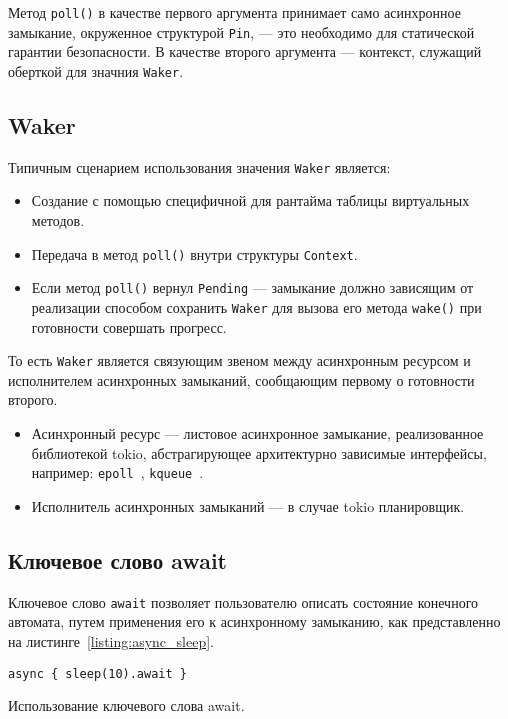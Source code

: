 Метод \verb|poll()| в качестве первого аргумента принимает само асинхронное замыкание, окруженное структурой \verb|Pin|, --- это необходимо для статической гарантии безопасности. В качестве второго аргумента --- контекст, служащий оберткой для значния \verb|Waker|.

\subsection{Waker}

Типичным сценарием использования значения \verb|Waker| является:

\begin{itemize}
    \item Создание с помощью специфичной для рантайма таблицы виртуальных методов.
    \item Передача в метод \verb|poll()| внутри структуры \verb|Context|.
    \item Если метод \verb|poll()| вернул \verb|Pending| --- замыкание должно зависящим от реализации способом сохранить \verb|Waker| для вызова его метода \verb|wake()| при готовности совершать прогресс.
\end{itemize}

То есть \verb|Waker| является связующим звеном между асинхронным ресурсом и исполнителем асинхронных замыканий, сообщающим первому о готовности второго.

\begin{itemize}
    \item Асинхронный ресурс --- листовое асинхронное замыкание, реализованное библиотекой tokio, абстрагирующее архитектурно зависимые интерфейсы, например: \verb|epoll|~\cite{epollLib}, \verb|kqueue|~\cite{kqueue}.
    \item Исполнитель асинхронных замыканий --- в случае tokio планировщик.
\end{itemize}

\subsection{Ключевое слово await}

Ключевое слово \verb|await| позволяет пользователю описать состояние конечного автомата, путем применения его к асинхронному замыканию, как представленно на листинге~\ref{listing:async_sleep}.

\begin{listing}[H]
    \begin{verbatim}
async { sleep(10).await }
    \end{verbatim}

    \caption{Использование ключевого слова await.}
    \label{listing:async_sleep}
\end{listing}

